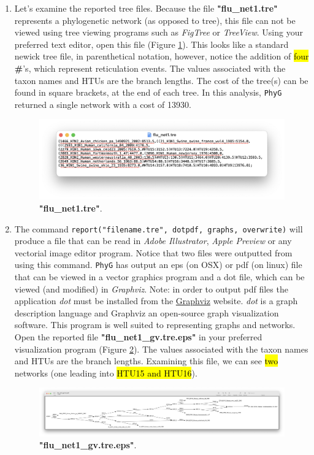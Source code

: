 \documentclass[11pt]{article}
\newcommand{\phyg}{\texttt{PhyG} }
\begin{document}
\begin{enumerate}
\item Let's examine the reported tree files. Because the file \textbf{"flu\_net1.tre"} 
represents a phylogenetic network (as opposed to tree), this file can not be viewed 
using tree viewing programs such as \textit{FigTree} or \textit{TreeView}. Using 
your preferred text editor, open this file (Figure \ref{tre1}). This looks like a standard 
newick tree file, in parenthetical notation, however, notice the addition of \hl{four} 
\textbf{\#}'s, which represent reticulation events. The values associated with 
the taxon names and HTUs are the branch lengths. The cost of the tree(s) can 
be found in square brackets, at the end of each tree. In this analysis, \phyg returned 
a single network  with a cost of 13930.
 
\begin{figure}[H]
\centering
\includegraphics[width=\textwidth]{tre1.png}
\caption{\textbf{"flu\_net1.tre"}.}
\label{tre1}
\end{figure}

\item  The command \texttt{report("filename.tre", dotpdf, graphs, overwrite)} will 
produce a file that can be read in \textit{Adobe Illustrator}, \textit{Apple Preview} 
or any vectorial image editor program. Notice that two files were outputted from 
using this command. \phyg has output an eps (on OSX) or pdf (on linux) file that 
can be viewed in a vector graphics program and a dot file, which can be viewed 
(and modified) in \textit{Graphviz}. Note: in order to output pdf files the application 
\textit{dot} must be installed from the \href{https://graphviz.org/download/}{Graphviz} 
website. \textit{dot} is a graph description language and Graphviz an open-source 
graph visualization software. This program is well suited to representing graphs 
and networks. Open the reported file \textbf{"flu\_net1\_gv.tre.eps"} in your preferred
visualization program (Figure \ref{eps1}). The values associated with the taxon 
names and HTUs are the branch lengths. Examining this file, we can see \hl{two} 
networks (one leading into\hl{ HTU15 and HTU16}).

\begin{figure}[H]
\centering
\includegraphics[width=\textwidth]{eps1.png}
\caption{\textbf{"flu\_net1\_gv.tre.eps"}.}
\label{eps1}
\end{figure}

\end{enumerate}
\end{document}
